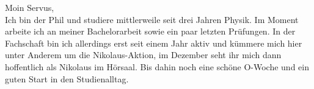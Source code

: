 \begin{multicols}{2}
{
Moin Servus, \\ 
Ich bin der Phil und studiere mittlerweile seit drei Jahren Physik. Im Moment arbeite ich an meiner Bachelorarbeit sowie ein paar letzten Prüfungen. In der Fachschaft bin ich allerdings erst seit einem Jahr aktiv und kümmere mich hier unter Anderem um die Nikolaus-Aktion, im Dezember seht ihr mich dann hoffentlich als Nikolaus im Hörsaal. Bis dahin noch eine schöne O-Woche und ein guten Start in den Studienalltag. 
}

\vspace{0.3cm}


\end{multicols}
